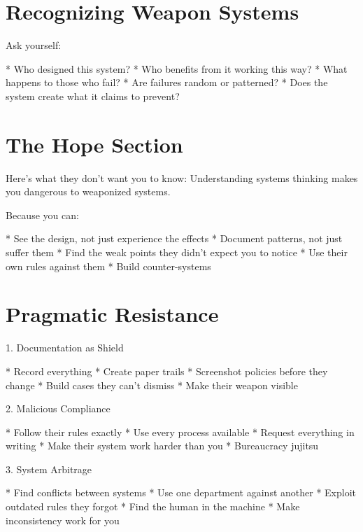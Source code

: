 \documentclass[12pt,oneside]{book}
\begin{document}
\section{Recognizing Weapon Systems}

Ask yourself:

                    * Who designed this system?
                    * Who benefits from it working this way?
                    * What happens to those who fail?
                    * Are failures random or patterned?
                    * Does the system create what it claims to prevent?

\section{The Hope Section}

Here's what they don't want you to know: Understanding systems thinking makes you dangerous to weaponized systems.

Because you can:

                    * See the design, not just experience the effects
                    * Document patterns, not just suffer them
                    * Find the weak points they didn't expect you to notice
                    * Use their own rules against them
                    * Build counter-systems

\section{Pragmatic Resistance}

                1. Documentation as Shield

                    * Record everything
                    * Create paper trails
                    * Screenshot policies before they change
                    * Build cases they can't dismiss
                    * Make their weapon visible

                2. Malicious Compliance

                    * Follow their rules exactly
                    * Use every process available
                    * Request everything in writing
                    * Make their system work harder than you
                    * Bureaucracy jujitsu

                3. System Arbitrage

                    * Find conflicts between systems
                    * Use one department against another
                    * Exploit outdated rules they forgot
                    * Find the human in the machine
                    * Make inconsistency work for you
\end{document}
